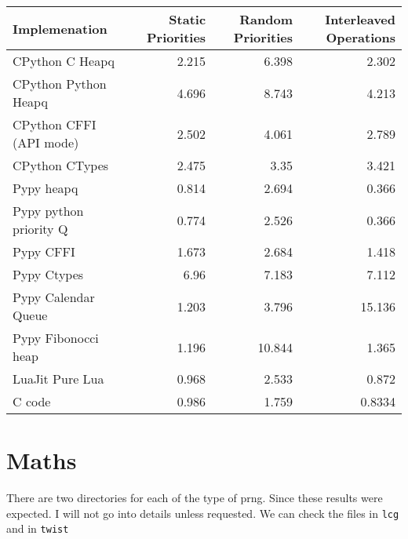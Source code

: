 \documentclass[11pt]{article}
\begin{document}
\begin{center}
\begin{tabular}{lrrr}
Implemenation & Static Priorities & Random Priorities & Interleaved Operations\\
\hline
CPython C Heapq & 2.215 & 6.398 & 2.302\\
CPython Python Heapq & 4.696 & 8.743 & 4.213\\
CPython CFFI (API mode) & 2.502 & 4.061 & 2.789\\
CPython CTypes & 2.475 & 3.35 & 3.421\\
\hline
Pypy heapq & 0.814 & 2.694 & 0.366\\
Pypy python priority Q & 0.774 & 2.526 & 0.366\\
Pypy CFFI & 1.673 & 2.684 & 1.418\\
Pypy Ctypes & 6.96 & 7.183 & 7.112\\
Pypy Calendar Queue & 1.203 & 3.796 & 15.136\\
Pypy Fibonocci heap & 1.196 & 10.844 & 1.365\\
\hline
LuaJit Pure Lua & 0.968 & 2.533 & 0.872\\
C code & 0.986 & 1.759 & 0.8334\\
\end{tabular}
\end{center}



\section{Maths}
\label{sec-5}
There are two directories for each of the type of prng. 
Since these results were expected. I will not go into details unless requested.
We can check the files in \verb~lcg~ and in \verb~twist~ 
\end{document}
